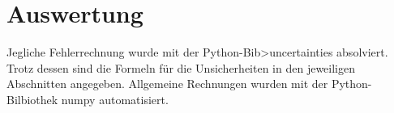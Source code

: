 \section{Auswertung}
\label{sec:Auswertung}
Jegliche Fehlerrechnung wurde mit der Python-Bib>uncertainties \cite{uncertainties} absolviert.
Trotz dessen sind die Formeln für die Unsicherheiten in den jeweiligen Abschnitten angegeben.
Allgemeine Rechnungen wurden mit der Python-Bilbiothek numpy \cite{numpy} automatisiert.